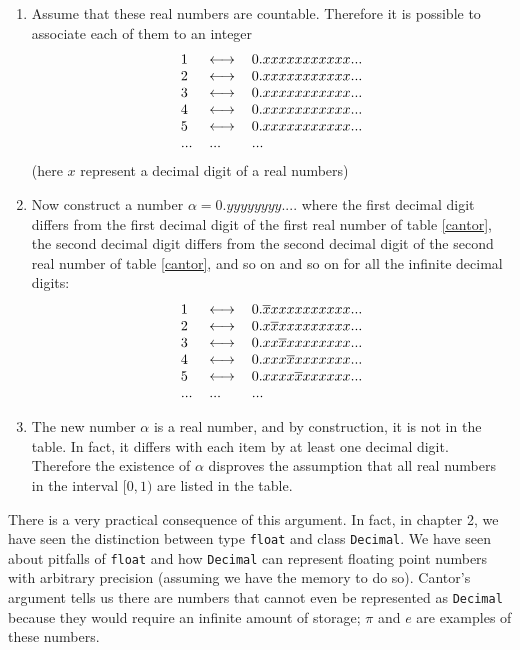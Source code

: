 \documentclass[justified, sixbynine]{tufte-book}
\def\ft{\small\tt}
\theoremstyle{plain}%
\newtheorem * {corollary}{Corollary}
\theoremstyle{definition}
\theoremstyle{remark}
\newtheorem * {remark}{Remark}
\newtheorem * {note}{Note}
\begin{document}
\begin{fullwidth}
\begin{enumerate}
\item  Assume that these real numbers are countable. Therefore it is
possible to associate each of them to an integer
\begin{equation}
\begin{tabular}{lll}
1 & $\longleftrightarrow $ & $0.xxxxxxxxxxx...$ \\
2 & $\longleftrightarrow $ & $0.xxxxxxxxxxx...$ \\
3 & $\longleftrightarrow $ & $0.xxxxxxxxxxx...$ \\
4 & $\longleftrightarrow $ & $0.xxxxxxxxxxx...$ \\
5 & $\longleftrightarrow $ & $0.xxxxxxxxxxx...$ \\
... & ... & ...
\end{tabular}
\label{cantor}
\end{equation}
(here $x$ represent a decimal digit of a real numbers)

\item  Now construct a number $\alpha =0.yyyyyyyy....$ where the first
decimal digit differs from the first decimal digit of the first real number
of table \ref{cantor}, the second decimal digit differs from the second
decimal digit of the second real number of table \ref{cantor}, and so on and
so on for all the infinite decimal digits:
\begin{equation}
\begin{tabular}{lll}
1 & $\longleftrightarrow $ & $0.\overline{x}xxxxxxxxxx...$ \\
2 & $\longleftrightarrow $ & $0.x\overline{x}xxxxxxxxx...$ \\
3 & $\longleftrightarrow $ & $0.xx\overline{x}xxxxxxxx...$ \\
4 & $\longleftrightarrow $ & $0.xxx\overline{x}xxxxxxx...$ \\
5 & $\longleftrightarrow $ & $0.xxxx\overline{x}xxxxxx...$ \\
... & ... & ...
\end{tabular}
\label{cantor2}
\end{equation}

\item  The new number $\alpha $ is a real number, and by construction, it is
not in the table. In fact, it differs with each item by at least one decimal
digit. Therefore the existence of $\alpha $ disproves the assumption that
all real numbers in the interval $[0, 1)$ are listed in the table.
\end{enumerate}

There is a very practical consequence of this argument. In fact, in chapter 2, we have seen the distinction between type {\ft float} and class {\ft Decimal}. We have seen about pitfalls of {\ft float} and how {\ft Decimal} can represent floating point numbers with arbitrary precision (assuming we have the memory to do so). Cantor's argument tells us there are numbers that cannot even be represented as {\ft Decimal} because they would require an infinite amount of storage; $\pi$ and $e$ are examples of these numbers.


\end{fullwidth}
\end{document}
